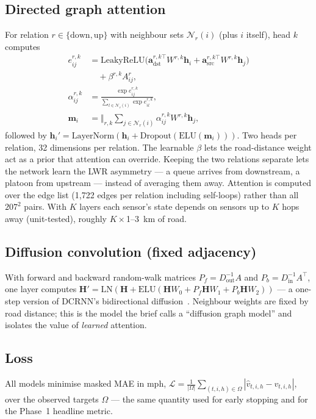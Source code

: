 \subsection{Directed graph attention}
For relation $r\in\{\text{down},\text{up}\}$ with neighbour sets $\mathcal{N}_r(i)$ (plus $i$ itself), head $k$ computes
\begin{align}
e^{r,k}_{ij}&=\mathrm{LeakyReLU}\big(\mathbf{a}^{r,k\top}_{\mathrm{dst}}W^{r,k}\mathbf{h}_i+\mathbf{a}^{r,k\top}_{\mathrm{src}}W^{r,k}\mathbf{h}_j\big)\nonumber\\&\quad+\beta^{r,k}A^{r}_{ij},\\
\alpha^{r,k}_{ij}&=\frac{\exp e^{r,k}_{ij}}{\sum_{l\in\mathcal{N}_r(i)}\exp e^{r,k}_{il}},\\
\mathbf{m}_i&=\big\Vert_{r,k}\textstyle\sum_{j\in\mathcal{N}_r(i)}\alpha^{r,k}_{ij}W^{r,k}\mathbf{h}_j,
\end{align}
followed by $\mathbf{h}_i'=\mathrm{LayerNorm}(\mathbf{h}_i+\mathrm{Dropout}(\mathrm{ELU}(\mathbf{m}_i)))$. Two heads per relation, 32 dimensions per relation. The learnable $\beta$ lets the road-distance weight act as a prior that attention can override. Keeping the two relations separate lets the network learn the LWR asymmetry --- a queue arrives from downstream, a platoon from upstream --- instead of averaging them away. Attention is computed over the edge list (1{,}722 edges per relation including self-loops) rather than all $207^2$ pairs. With $K$ layers each sensor's state depends on sensors up to $K$ hops away (unit-tested), roughly $K\times$1--3~km of road.

\subsection{Diffusion convolution (fixed adjacency)}
With forward and backward random-walk matrices $P_f=D_{\mathrm{out}}^{-1}A$ and $P_b=D_{\mathrm{in}}^{-1}A^\top$, one layer computes $\mathbf{H}'=\mathrm{LN}(\mathbf{H}+\mathrm{ELU}(\mathbf{H}W_0+P_f\mathbf{H}W_1+P_b\mathbf{H}W_2))$ --- a one-step version of DCRNN's bidirectional diffusion~\cite{li2018dcrnn}. Neighbour weights are fixed by road distance; this is the model the brief calls a ``diffusion graph model'' and isolates the value of \emph{learned} attention.

\subsection{Loss}
All models minimise masked MAE in mph, $\mathcal{L}=\frac{1}{|\Omega|}\sum_{(t,i,h)\in\Omega}|\hat v_{t,i,h}-v_{t,i,h}|$, over the observed targets $\Omega$ --- the same quantity used for early stopping and for the Phase~1 headline metric.

